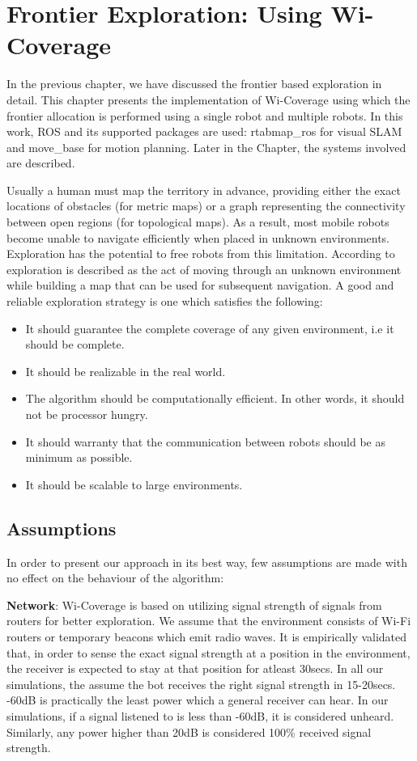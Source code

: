 \chapter{Frontier Exploration: Using Wi-Coverage}


\par In the previous chapter, we have discussed the frontier based exploration in detail. This chapter presents the implementation of Wi-Coverage using which the frontier allocation is performed using a single robot and multiple robots. In this work, ROS and its supported packages are used: rtabmap\_ros for visual SLAM and move\_base for motion planning. Later in the Chapter, the systems involved are described.
\par Usually a human must map the territory in advance, providing either the exact locations of obstacles (for metric maps) or a graph representing the connectivity between open regions (for topological maps). As a result, most mobile robots become unable to navigate efficiently when placed in unknown environments. Exploration has the potential to free robots from this limitation. According to \cite{17} exploration is described as the act of moving through an unknown environment while building a map that can be used for subsequent navigation. A good and reliable exploration strategy is one which satisfies the following:
\begin{itemize}
    \item It should guarantee the complete coverage of any given environment, i.e it should be complete.
    \item It should be realizable in the real world.
    \item The algorithm should be computationally efficient. In other words, it should not be processor hungry.
    \item It should warranty that the communication between robots should be as minimum as possible.
    \item It should be scalable to large environments.
\end{itemize}


\section{Assumptions}
In order to present our approach in its best way, few assumptions are made with no effect on the behaviour of the algorithm:

\textbf{Network}: Wi-Coverage is based on utilizing signal strength of signals from routers for better exploration. We assume that the environment consists of Wi-Fi routers or temporary beacons which emit radio waves. It is empirically validated that, in order to sense the exact signal strength at a position in the environment, the receiver is expected to stay at that position for atleast 30secs. In all our simulations, the assume the bot receives the right signal strength in 15-20secs.  
-60dB is practically the least power which a general receiver can hear. In our simulations, if a signal listened to is less than -60dB, it is considered unheard. Similarly, any power higher than 20dB is considered 100\% received signal strength.  

